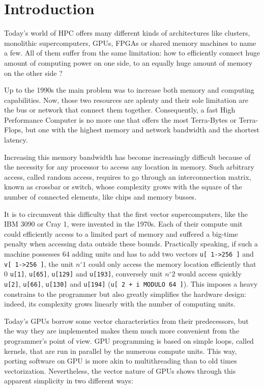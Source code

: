 \documentclass[a4paper,12pt]{article}
\begin{document}
\clearpage


%
%

\section{Introduction}
Today's world of HPC offers many different kinds of architectures like clusters, monolithic supercomputers, GPUs, FPGAs or shared memory machines to name a few. All of them suffer from the same limitation: how to efficiently connect huge amount of computing power on one side, to an equally huge amount of memory on the other side ?

Up to the 1990s the main problem was to increase both memory and computing capabilities. Now, those two resources are aplenty and their sole limitation are the bus or network that connect them together. Consequently, a fast High Performance Computer is no more one that offers the most Terra-Bytes or Terra-Flops, but one with the highest memory and network bandwidth and the shortest latency.

Increasing this memory bandwidth has become increasingly difficult because of the necessity for any processor to access any location in memory. Such arbitrary access, called random access, requires to go through an interconnection matrix, known as crossbar or switch, whose complexity grows with the square of the number of connected elements, like chips and memory busses.

It is to circumvent this difficulty that the first vector supercomputers, like the IBM 3090 or Cray 1, were invented in the 1970s. Each of their compute unit could efficiently access to a limited part of memory and suffered a big-time penalty when accessing data outside these bounds. Practically speaking, if such a machine possesses 64 adding units and has to add two vectors {\tt u[ 1->256 ]} and {\tt v[ 1->256 ]}, the unit $n^\circ1$ could only access the memory location efficiently that 0 {\tt u[1]}, {\tt u[65]}, {\tt u[129]} and {\tt u[193]}, conversely unit $n^\circ2$ would access quickly {\tt u[2]}, {\tt u[66]}, {\tt u[130]} and {\tt u[194]} ({\tt u[ 2 + i MODULO 64 ]}). This imposes a heavy constrains to the programmer but also greatly simplifies the hardware design: indeed, its complexity grows linearly with the number of computing units.

Today's GPUs borrow some vector characteristics from their predecessors, but the way they are implemented makes them much more convenient from the programmer's point of view. GPU programming is based on simple loops, called kernels, that are run in parallel by the numerous compute units. This way, porting software on GPU is more akin to multithreading than to old times vectorization. Nevertheless, the vector nature of GPUs shows through this apparent simplicity in two different ways:
\end{document}
